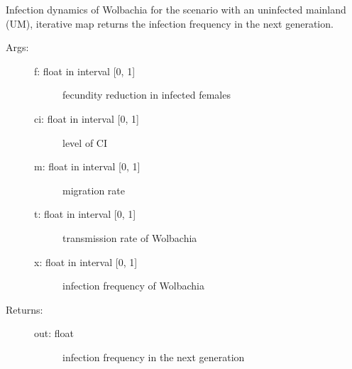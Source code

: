 \documentclass[letterpaper,10pt,english]{sphinxmanual}
\begin{document}
\begin{fulllineitems}
\label{index:wspec.analytical.dynamics_UM}
Infection dynamics of Wolbachia for the scenario with an 
uninfected mainland (UM), iterative map returns the infection 
frequency in the next generation.
\begin{description}
\item[{Args:}] \leavevmode\begin{description}
\item[{f: float in interval {[}0, 1{]}}] \leavevmode
fecundity reduction in infected females

\item[{ci: float in interval {[}0, 1{]}}] \leavevmode
level of CI

\item[{m: float in interval {[}0, 1{]}}] \leavevmode
migration rate

\item[{t: float in interval {[}0, 1{]}}] \leavevmode
transmission rate of Wolbachia

\item[{x: float in interval {[}0, 1{]}}] \leavevmode
infection frequency of Wolbachia

\end{description}

\item[{Returns:}] \leavevmode\begin{description}
\item[{out: float}] \leavevmode
infection frequency in the next generation

\end{description}

\end{description}

\end{fulllineitems}

\end{document}
